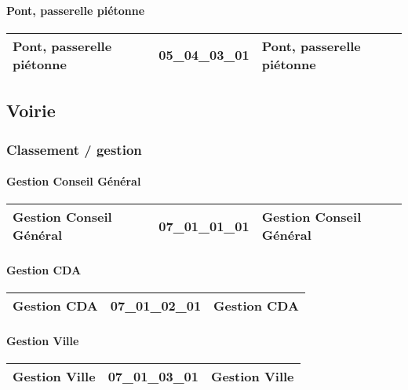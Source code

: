 \documentclass[12pt,titlepage,oneside]{book}
\begin{document}
\paragraph{Pont, passerelle piétonne}
\noindent
\vspace{\baselineskip}

\renewcommand{\arraystretch}{1.2}
\begin{supertabular}{|p{10cm}|c|p{15cm}|}
 Pont, passerelle piétonne & 05\_04\_03\_01 & Pont, passerelle piétonne\\
\hline
\end{supertabular}
\subsection{Voirie}
\subsubsection{\large Classement / gestion}
\paragraph{Gestion Conseil Général}
\noindent
\vspace{\baselineskip}

\renewcommand{\arraystretch}{1.2}
\begin{supertabular}{|p{10cm}|c|p{15cm}|}
 Gestion Conseil Général & 07\_01\_01\_01 & Gestion Conseil Général\\
\hline
\end{supertabular}


\paragraph{Gestion CDA}
\noindent
\vspace{\baselineskip}

\renewcommand{\arraystretch}{1.2}
\begin{supertabular}{|p{10cm}|c|p{15cm}|}
 Gestion CDA & 07\_01\_02\_01 & Gestion CDA\\
\hline
\end{supertabular}


\paragraph{Gestion Ville}
\noindent
\vspace{\baselineskip}

\renewcommand{\arraystretch}{1.2}
\begin{supertabular}{|p{10cm}|c|p{15cm}|}
 Gestion Ville & 07\_01\_03\_01 & Gestion Ville\\
\hline
\end{supertabular}
\end{document}
